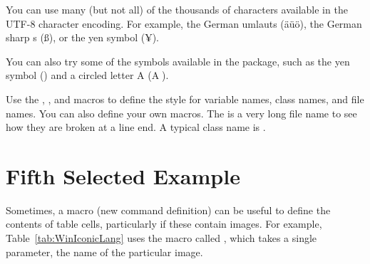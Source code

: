 You can use many (but not all) of the thousands of characters
available in the UTF-8 \citep{Wikipedia-UTF8,Unicode-Charts} character
encoding. For example, the German umlauts (äüö), the German sharp s
(ß), or the yen symbol (¥).

You can also try some of the  symbols available
in the  package, such as the yen symbol (\textyen) and
a circled letter A (\textcircled{A}).

Use the , , and  macros to
define the style for variable names, class names, and file names. You
can also define your own macros. The is a very long file name
 to see how they are
broken at a line end. A typical class name is
.






\section{Fifth Selected Example}

Sometimes, a macro (new command definition) can be useful to define
the contents of table cells, particularly if these contain images. For
example, Table~\ref{tab:WinIconicLang} uses the macro called
, which takes a single parameter, the name of
the particular image.



